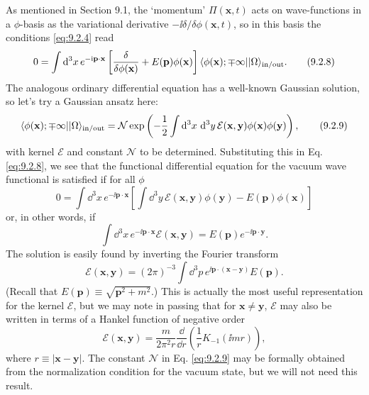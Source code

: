 As mentioned in Section 9.1, the `momentum' $\Pi(\mathbf{x},t)$ acts on
wave-functions in a $\phi$-basis as the variational derivative
$-\ii\delta/\delta\phi(\mathbf{x},t)$, so in this basis the conditions \eqref{eq:9.2.4}
read
\begin{equation}
  0=\int \mathop{}\!\mathrm{d}^3x\,e^{-\mathrm{i}\mathbf{p}\cdot\mathbf{x}}
  \left[\frac{\delta}{\delta\phi(\mathbf{x})}+E(\mathbf{p})\phi(\mathbf{x})\right]
  \langle \phi(\mathbf{x});\mp\infty\rvert\lvert \Omega\rangle_{\mathrm{in/out}}.
  \tag{9.2.8}\label{eq:9.2.8}
\end{equation}
The analogous ordinary differential equation has a well-known Gaussian
solution, so let's try a Gaussian ansatz here:
\begin{equation}
  \langle \phi(\mathbf{x});\mp\infty\rvert\lvert \Omega\rangle_{\mathrm{in/out}}
  =\mathcal{N}\exp\left(-\frac12\int \mathop{}\!\mathrm{d}^3x\,\mathop{}\!\mathrm{d}^3y\,
  \mathcal{E}(\mathbf{x},\mathbf{y})\phi(\mathbf{x})\phi(\mathbf{y})\right),
  \tag{9.2.9}\label{eq:9.2.9}
\end{equation}
with kernel $\mathcal{E}$ and constant $\mathcal{N}$ to be determined.
Substituting this in Eq. \eqref{eq:9.2.8}, we see that the functional differential
equation for the vacuum wave functional is satisfied if for all $\phi$
\begin{equation}
  0=\int \dd^3x\,e^{-\ii\mathbf{p}\cdot\mathbf{x}}
  \left[\int \dd^3y\,\mathcal{E}(\mathbf{x},\mathbf{y})\phi(\mathbf{y})
  -E(\mathbf{p})\phi(\mathbf{x})\right]
  \tag{9.2.10}\label{eq:9.2.10}
\end{equation}
or, in other words, if
\begin{equation}
  \int \dd^3x\,e^{-\ii\mathbf{p}\cdot\mathbf{x}}
  \mathcal{E}(\mathbf{x},\mathbf{y})
  =E(\mathbf{p})e^{-\ii\mathbf{p}\cdot\mathbf{y}}.
  \tag{9.2.11}\label{eq:9.2.11}
\end{equation}
The solution is easily found by inverting the Fourier transform
\begin{equation}
  \mathcal{E}(\mathbf{x},\mathbf{y})=(2\pi)^{-3}
  \int \dd^3p\,e^{\ii\mathbf{p}\cdot(\mathbf{x}-\mathbf{y})}E(\mathbf{p}).
  \tag{9.2.12}\label{eq:9.2.12}
\end{equation}
(Recall that $E(\mathbf{p})\equiv\sqrt{\mathbf{p}^2+m^2}$.) This is
actually the most useful representation for the kernel $\mathcal{E}$, but we
may note in passing that for $\mathbf{x}\ne\mathbf{y}$, $\mathcal{E}$ may
also be written in terms of a Hankel function of negative order
\begin{equation}
  \mathcal{E}(\mathbf{x},\mathbf{y})=
  \frac{m}{2\pi^2r}\frac{\dd}{\dd r}\left(\frac{1}{r}K_{-1}(\ii mr)\right),
  \tag{9.2.13}\label{eq:9.2.13}
\end{equation}
where $r\equiv|\mathbf{x}-\mathbf{y}|$. The constant $\mathcal{N}$ in
Eq. \eqref{eq:9.2.9} may be formally obtained from the normalization condition for
the vacuum state, but we will not need this result.


